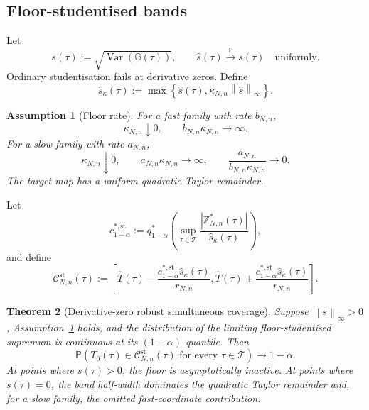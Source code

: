 \documentclass[11pt]{article}
\newtheorem{assumption}{Assumption}[section]
\newtheorem{theorem}[assumption]{Theorem}
\theoremstyle{remark}
\newcommand{\Pp}{\mathbb P}
\newcommand{\Var}{\operatorname{Var}}
\newcommand{\cT}{\mathcal T}
\newcommand{\cC}{\mathcal C}
\newcommand{\norm}[1]{\left\lVert #1\right\rVert}
\newcommand{\abs}[1]{\left\lvert #1\right\rvert}
\newcommand{\an}{a_{N,n}}
\newcommand{\bn}{b_{N,n}}
\begin{document}
\subsection{Floor-studentised bands}

Let
\begin{equation}\label{eq:s}
 s(\tau):=\sqrt{\Var(\mathbb G(\tau))},
 \qquad
 \widehat s(\tau)\overset{\Pp}{\longrightarrow}s(\tau)
 \quad\text{uniformly}.
\end{equation}
Ordinary studentisation fails at derivative zeros. Define
\begin{equation}\label{eq:floor}
 \widehat s_\kappa(\tau)
 :=
 \max\left\{
 \widehat s(\tau),
 \kappa_{N,n}\norm{\widehat s}_\infty
 \right\}.
\end{equation}

\begin{assumption}[Floor rate]\label{ass:floor}
For a fast family with rate $\bn$,
\[
 \kappa_{N,n}\downarrow0,
 \qquad
 \bn\kappa_{N,n}\to\infty.
\]
For a slow family with rate $\an$,
\[
 \kappa_{N,n}\downarrow0,
 \qquad
 \an\kappa_{N,n}\to\infty,
 \qquad
 \frac{\an}{\bn\kappa_{N,n}}\to0.
\]
The target map has a uniform quadratic Taylor remainder.
\end{assumption}

Let
\begin{equation}\label{eq:cst}
 c_{1-\alpha}^{*,\mathrm{st}}
 :=
 q_{1-\alpha}^*
 \left(
 \sup_{\tau\in\cT}
 \frac{\abs{\mathbb Z_{N,n}^*(\tau)}}
 {\widehat s_\kappa(\tau)}
 \right),
\end{equation}
and define
\begin{equation}\label{eq:st-band}
 \cC_{N,n}^{\mathrm{st}}(\tau)
 :=
 \left[
 \widehat T(\tau)
 -
 \frac{c_{1-\alpha}^{*,\mathrm{st}}\widehat s_\kappa(\tau)}
 {r_{N,n}},
 \widehat T(\tau)
 +
 \frac{c_{1-\alpha}^{*,\mathrm{st}}\widehat s_\kappa(\tau)}
 {r_{N,n}}
 \right].
\end{equation}

\begin{theorem}[Derivative-zero robust simultaneous coverage]\label{thm:st-band}
Suppose $\norm{s}_\infty>0$, Assumption~\ref{ass:floor} holds, and the distribution of the limiting floor-studentised supremum is continuous at its $(1-\alpha)$ quantile. Then
\[
 \Pp\left(
 T_0(\tau)\in\cC_{N,n}^{\mathrm{st}}(\tau)
 \text{ for every }\tau\in\cT
 \right)
 \longrightarrow1-\alpha.
\]
At points where $s(\tau)>0$, the floor is asymptotically inactive. At points where $s(\tau)=0$, the band half-width dominates the quadratic Taylor remainder and, for a slow family, the omitted fast-coordinate contribution.
\end{theorem}
\end{document}
